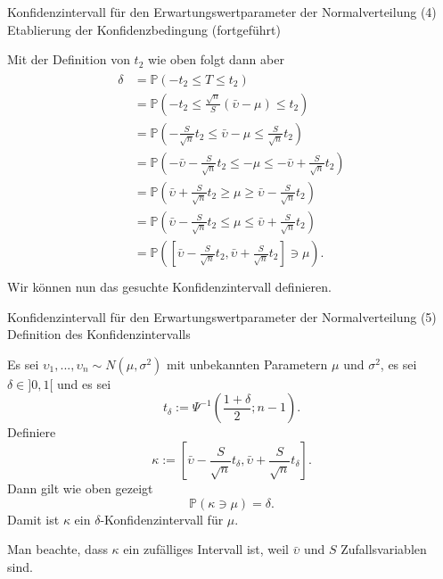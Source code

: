 \documentclass[
  8pt,
  ignorenonframetext,
]{beamer}
\newcommand{\ups} {\upsilon}
\begin{document}
\begin{frame}{Konfidenzintervall für den Erwartungswertparameter der
Normalverteilung}
\protect\hypertarget{konfidenzintervall-fuxfcr-den-erwartungswertparameter-der-normalverteilung-4}{}
\noindent (4) Etablierung der Konfidenzbedingung (fortgeführt)

\small

Mit der Definition von \(t_2\) wie oben folgt dann aber \footnotesize
\begin{align}
\begin{split}
\delta
& =
\mathbb{P}\left(-t_2 \le T \le t_2 \right)                                                                          \\
& =
\mathbb{P}\left(-t_2 \le \frac{\sqrt{n}}{S}(\bar{\ups} - \mu) \le t_2 \right)                                       \\
& =
\mathbb{P}\left(-\frac{S}{\sqrt{n}}t_2 \le \bar{\ups} - \mu \le \frac{S}{\sqrt{n}}t_2 \right)                   \\
& =
\mathbb{P}\left(-\bar{\ups} -\frac{S}{\sqrt{n}}t_2 \le - \mu \le - \bar{\ups} + \frac{S}{\sqrt{n}}t_2 \right)   \\
& =
\mathbb{P}\left(\bar{\ups} + \frac{S}{\sqrt{n}}t_2 \ge \mu \ge \bar{\ups} - \frac{S}{\sqrt{n}}t_2 \right)       \\
& =
\mathbb{P}\left(\bar{\ups} - \frac{S}{\sqrt{n}}t_2 \le \mu \le \bar{\ups} + \frac{S}{\sqrt{n}}t_2 \right)       \\
& =
\mathbb{P}\left(\left[\bar{\ups} - \frac{S}{\sqrt{n}}t_2, \bar{\ups} + \frac{S}{\sqrt{n}}t_2\right] \ni \mu \right).        \\
\end{split}
\end{align} \small Wir können nun das gesuchte Konfidenzintervall
definieren.
\end{frame}

\begin{frame}{Konfidenzintervall für den Erwartungswertparameter der
Normalverteilung}
\protect\hypertarget{konfidenzintervall-fuxfcr-den-erwartungswertparameter-der-normalverteilung-5}{}
\noindent(5) Definition des Konfidenzintervalls \small

Es sei \(\ups_1,...,\ups_n \sim N(\mu,\sigma^2)\) mit unbekannten
Parametern \(\mu\) und \(\sigma^2\), es sei \(\delta \in ]0,1[\) und es
sei \begin{equation}
t_\delta := \Psi^{-1}\left(\frac{1+\delta}{2}; n - 1\right).
\end{equation} Definiere \begin{equation}
\kappa :=
\left[\bar{\ups} - \frac{S}{\sqrt{n}}t_\delta,
\bar{\ups} + \frac{S}{\sqrt{n}}t_\delta\right].
\end{equation} Dann gilt wie oben gezeigt \begin{equation}
\mathbb{P}(\kappa \ni \mu) = \delta.
\end{equation} Damit ist \(\kappa\) ein \(\delta\)-Konfidenzintervall
für \(\mu\).

Man beachte, dass \(\kappa\) ein zufälliges Intervall ist, weil
\(\bar{\ups}\) und \(S\) Zufallsvariablen sind.
\end{frame}
\end{document}
